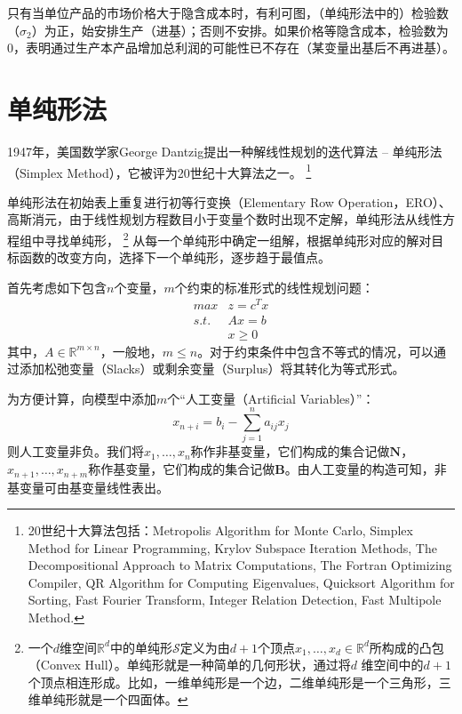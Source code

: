 只有当单位产品的市场价格大于隐含成本时，有利可图，（单纯形法中的）检验数（$\sigma_2$）为正，始安排生产（进基）；否则不安排。如果价格等隐含成本，检验数为0，表明通过生产本产品增加总利润的可能性已不存在（某变量出基后不再进基）。

\section{单纯形法}\label{sec:simplexmethod}
1947年，美国数学家George Dantzig\cite{dantzig1998linear}提出一种解线性规划的迭代算法 -- 单纯形法（Simplex Method），它被评为20世纪十大算法之一。
\footnote{20世纪十大算法包括：Metropolis Algorithm for Monte Carlo\cite{beichl2000metropolis}, Simplex Method for Linear Programming\cite{nash2000dantzig}, Krylov Subspace Iteration Methods\cite{van2000krylov}, The Decompositional Approach to Matrix Computations\cite{stewart2000decompositional}, The Fortran Optimizing Compiler\cite{padua2000fortran}, QR Algorithm for Computing Eigenvalues\cite{parlett2000qr}, Quicksort Algorithm for Sorting\cite{jaja2000perspective}, Fast Fourier Transform\cite{rockmore2000fft}, Integer Relation Detection\cite{bailey2000integer}, Fast Multipole Method\cite{board2000fast}.}

单纯形法在初始表上重复进行初等行变换（Elementary Row Operation，ERO）、高斯消元，由于线性规划方程数目小于变量个数时出现不定解，单纯形法从线性方程组中寻找单纯形，
\footnote{一个$d$维空间$\mathbb{R}^d$中的单纯形$\mathcal{S}$定义为由$d+1$个顶点$x_1,\ldots, x_d\in \mathbb{R}^d$所构成的凸包（Convex Hull）。单纯形就是一种简单的几何形状，通过将$d$ 维空间中的$d+1$个顶点相连形成。比如，一维单纯形是一个边，二维单纯形是一个三角形，三维单纯形就是一个四面体。}
从每一个单纯形中确定一组解，根据单纯形对应的解对目标函数的改变方向，选择下一个单纯形，逐步趋于最值点。

首先考虑如下包含$n$个变量，$m$个约束的标准形式的线性规划问题：
\begin{equation}
  \begin{array}{ll}
  \textit{max} & z = c^Tx\\
  \textit{s.t.} & Ax = b\\
  & x \ge 0
  \end{array}
\end{equation}
其中，$A\in \mathbb{R}^{m\times n}$，一般地，$m\le n$。对于约束条件中包含不等式的情况，可以通过添加松弛变量（Slacks）或剩余变量（Surplus）将其转化为等式形式。

为方便计算，向模型中添加$m$个“人工变量（Artificial Variables）”：
\[
x_{n+i} = b_i - \sum_{j=1}^n{a_{ij}x_j}
\]
则人工变量非负。我们将$x_1,\ldots,x_n$称作非基变量，它们构成的集合记做$\textbf{N}$，$x_{n+1},\ldots,x_{n+m}$称作基变量，它们构成的集合记做$\textbf{B}$。由人工变量的构造可知，非基变量可由基变量线性表出。

